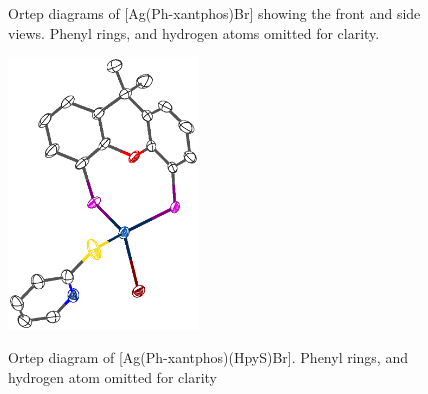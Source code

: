 \begin{figure}[h]
\begin{center}
\begin{minipage}[c]{0.4\textwidth}
\end{minipage}
\caption[Ortep diagrams of Ag(Ph-xantphos)Br]{Ortep diagrams of [Ag(Ph-xantphos)Br] showing the front and side views.\cite{Kaltzoglou2007}  Phenyl rings, and hydrogen atoms omitted for clarity.}
\vspace{0.2cm}
\label{AgxantphosBr}
\end{center}
\end{figure}
\vspace{0.2cm}

\begin{figure}[htb] 
\begin{center}
\vspace{0.5cm}
\includegraphics[width=0.45\textwidth]{../Othercrystals/AgxantphosBrHpyS.eps}
\caption[Ortep diagram of Ag(Ph-xantphos)(HpyS)Br]{Ortep diagram of [Ag(Ph-xantphos)(HpyS)Br].\cite{Kaltzoglou2007} Phenyl rings, and hydrogen atom omitted for clarity}
\vspace{0.2cm}
\label{AgxantphosBrHpyS}
\end{center}
\end{figure}
\vspace{0.2cm}



